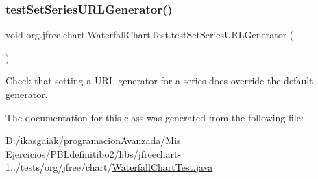 \subsubsection{\texorpdfstring{test\+Set\+Series\+U\+R\+L\+Generator()}{testSetSeriesURLGenerator()}}
{\footnotesize\ttfamily void org.\+jfree.\+chart.\+Waterfall\+Chart\+Test.\+test\+Set\+Series\+U\+R\+L\+Generator (\begin{DoxyParamCaption}{ }\end{DoxyParamCaption})}

Check that setting a U\+RL generator for a series does override the default generator. 

The documentation for this class was generated from the following file\+:\begin{DoxyCompactItemize}
\item 
D\+:/ikasgaiak/programacion\+Avanzada/\+Mis Ejercicios/\+P\+B\+Ldefinitibo2/libs/jfreechart-\/1../tests/org/jfree/chart/\mbox{\hyperlink{_waterfall_chart_test_8java}{Waterfall\+Chart\+Test.\+java}}\end{DoxyCompactItemize}
